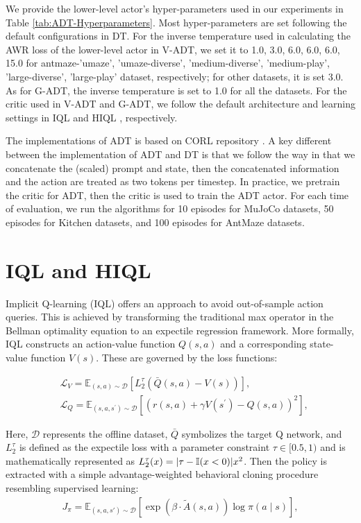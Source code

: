 We provide the lower-level actor's hyper-parameters used in our experiments in Table \ref{tab:ADT-Hyperparameters}. Most hyper-parameters are set following the default configurations in DT. For the inverse temperature used in calculating the AWR loss of the lower-level actor in V-ADT, we set it to {1.0, 3.0, 6.0, 6.0, 6.0, 15.0} for antmaze-{'umaze', 'umaze-diverse',  'medium-diverse', 'medium-play', 'large-diverse', 'large-play'} dataset, respectively; for other datasets, it is set 3.0. As for G-ADT, the inverse temperature is set to 1.0 for all the datasets.  For the critic used in V-ADT and G-ADT, we follow the default architecture and learning settings in IQL \citep{kostrikov2022offline} and HIQL \citep{park2023hiql}, respectively.  

The implementations of ADT is based on CORL repository \citep{tarasov2022corl}. A key different between the implementation of ADT and DT is that we follow the way in \citep{badrinath2023waypoint} that we concatenate the (scaled) prompt and state, then the concatenated information and the action are treated as two tokens per timestep. In practice, we pretrain the critic for ADT, then the critic is used to train the ADT actor. For each time of evaluation, we run the algorithms for 10 episodes for MuJoCo datasets, 50 episodes for Kitchen datasets, and 100 episodes for AntMaze datasets.

\section{IQL and HIQL}

Implicit Q-learning (IQL) \citep{kostrikov2022offline} offers an approach to avoid out-of-sample action queries. This is achieved by transforming the traditional max operator in the Bellman optimality equation to an expectile regression framework. More formally, IQL constructs an action-value function $Q(s, a)$ and a corresponding state-value function $V(s)$. These are governed by the loss functions:


\begin{align}
& \mathcal{L}_V=\mathbb{E}_{(s, a) \sim \mathcal{D}}\left[L_2^\tau\left(\bar{Q}(s, a)-V(s)\right)\right], \\
& \mathcal{L}_Q=\mathbb{E}_{\left(s, a, s^{\prime}\right) \sim \mathcal{D}}\left[\left(r(s, a)+\gamma V\left(s^{\prime}\right)-Q(s, a)\right)^2\right],
\end{align}



Here, $\mathcal{D}$ represents the offline dataset, $\bar{Q}$ symbolizes the target Q network, and $L_2^\tau$ is defined as the expectile loss with a parameter constraint $\tau \in[0.5,1)$ and is mathematically represented as $L_2^\tau(x)=|\tau-{\mathbb{I}}(x<0)| x^2$. Then the policy is extracted with a simple advantage-weighted behavioral cloning procedure resembling supervised learning:
\begin{align}
J_{\pi}=\mathbb{E}_{\left(s, a, s'\right) \sim \mathcal{D}}\left[\exp \left(\beta \cdot \tilde{A}\left(s, a\right)\right) \log \pi \left(a \mid s\right)\right],
\end{align}


